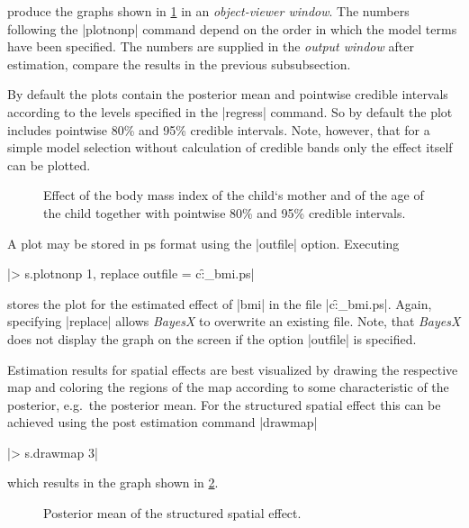 produce the graphs shown in \ref{step:bmi1} in an {\it object-viewer window}. The numbers following the |plotnonp| command
depend on the order in which the model terms have been specified. The numbers are supplied in the {\it output window} after
estimation, compare the results in the previous subsubsection.

By default the plots contain the posterior mean and pointwise credible intervals according to the levels specified in the
|regress| command. So by default the plot includes pointwise 80\% and 95\% credible intervals. Note, however, that for a simple
model selection without calculation of credible bands only the effect itself can be plotted.

\begin{figure}[ht]
\begin{center}
{\it\caption{Effect of the body mass index of the child`s mother and
of the age of the child together with pointwise 80\% and 95\%
credible intervals. \label{step:bmi1}}}
\end{center}
\end{figure}

A plot may be stored in ps format using the |outfile| option. Executing

|> s.plotnonp 1, replace outfile = c:\data\f_bmi.ps|

stores the plot for the estimated effect of |bmi| in the file |c:\data\f_bmi.ps|. Again, specifying |replace| allows {\it
BayesX} to overwrite an existing file. Note, that {\it BayesX} does not display the graph on the screen if the option |outfile|
is specified.

Estimation results for spatial effects are best visualized by drawing the respective map and coloring the regions of the map
according to some characteristic of the posterior, e.g.~the posterior mean. For the structured spatial effect this can be
achieved using the post estimation command |drawmap|

|> s.drawmap 3|

which results in the graph shown in \ref{step:spat1}.

\begin{figure}[ht]
\begin{center}
{\it\caption{Posterior mean of the structured spatial
effect.\label{step:spat1}}}
\end{center}
\end{figure}

